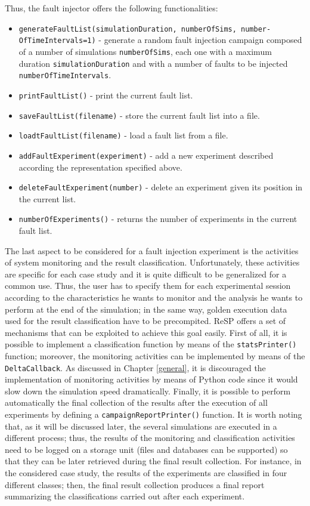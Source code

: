 \indent Thus, the fault injector offers the following functionalities:
\begin{itemize}
\item \texttt{generateFaultList(simulationDuration, numberOfSims, number- OfTimeIntervals=1)} - generate a random fault injection campaign composed of a number of simulations \texttt{numberOfSims}, each one with a maximum duration \texttt{simulationDuration} and with a number of faults to be injected \texttt{numberOfTimeIntervals}. 
\item \texttt{printFaultList()} - print the current fault list.
\item \texttt{saveFaultList(filename)} - store the current fault list into a file.
\item \texttt{loadtFaultList(filename)} - load a fault list from a file.
\item \texttt{addFaultExperiment(experiment)} - add a new experiment described according the representation specified above.
\item \texttt{deleteFaultExperiment(number)} - delete an experiment given its position in the current list.
\item \texttt{numberOfExperiments()} - returns the number of experiments in the current fault list.
\end{itemize}

\indent The last aspect to be considered for a fault injection experiment is the activities of system monitoring and the result classification. Unfortunately, these activities are specific for each case study and it is quite difficult to be generalized for a common use. Thus, the user has to specify them for each experimental session according to the characteristics he wants to monitor and the analysis he wants to perform at the end of the simulation; in the same way, golden execution data used for the result classification have to be precompited. ReSP offers a set of mechanisms that can be exploited to achieve this goal easily. First of all, it is possible to implement a classification function by means of the \texttt{statsPrinter()} function; moreover, the monitoring activities can be implemented by means of the \texttt{DeltaCallback}. As discussed in Chapter \ref{general}, it is discouraged the implementation of monitoring activities by means of Python code since it would slow down the simulation speed dramatically. Finally, it is possible to perform automatically the final collection of the results after the execution of all experiments by defining a \texttt{campaignReportPrinter()} function. It is worth noting that, as it will be discussed later, the several simulations are executed in a different process; thus, the results of the monitoring and classification activities need to be logged on a storage unit (files and databases can be supported) so that they can be later retrieved during the final result collection. For instance, in the considered case study, the results of the experiments are classified in four different classes; then, the final result collection produces a final report summarizing the classifications carried out after each experiment.


